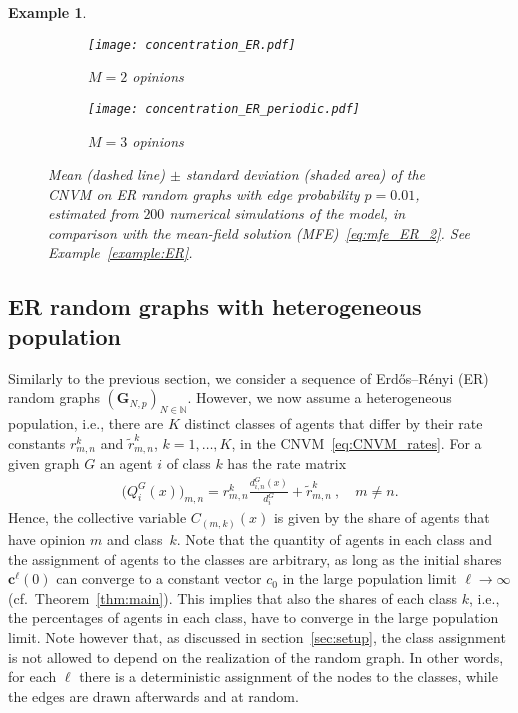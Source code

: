 \documentclass[a4paper,
               10pt,
               pdftex,
               normalheadings,
               headsepline,
               footsepline,
               headinclude,
               footinclude,
               DIV=14,
               abstracton]
{scrartcl}
\newtheorem{example}[theorem]{Example}
\newcommand{\rv}[1]{\bm{#1}}
\newcommand{\review}[1]{{#1}}
\begin{document}
\begin{example}
\begin{figure}
     \centering
     \begin{subfigure}[t]{0.49\textwidth}
         \centering
         \texttt{[image: concentration\_ER.pdf]}
         \caption{$M=2$ opinions}
         \label{fig:concentration_ER_a}
     \end{subfigure}
     \hfill
     \begin{subfigure}[t]{0.49\textwidth}
         \centering
         \texttt{[image: concentration\_ER\_periodic.pdf]}
         \caption{$M=3$ opinions}
         \label{fig:concentration_ER_b}
     \end{subfigure}
        \caption{Mean (dashed line) $\pm$ standard deviation (shaded area) of the CNVM on ER random graphs with edge probability $p=0.01$, estimated from $200$ \review{numerical simulations of the model}, in comparison with the mean-field solution (MFE)~\eqref{eq:mfe_ER_2}. See Example~\ref{example:ER}.}
        \label{fig:concentration_ER}
\end{figure}
\end{example}

\subsection{ER random graphs with heterogeneous population}
\label{subsec:hetero}

Similarly to the previous section, we consider a sequence of Erd\H{o}s--Rényi (ER) random graphs $(\rv{G}_{N,p})_{N\in\mathbb{N}}$.
However, we now assume a heterogeneous population, i.e., there are $K$ distinct classes of agents that differ by their rate constants $r^k_{m,n}$ and $\tilde{r}^k_{m,n}$, $k = 1,\dots,K$, in the CNVM~\eqref{eq:CNVM_rates}. 
For a given graph $G$ an agent $i$ of class $k$ has the rate matrix
\begin{align}
    \big(Q_i^G(x)\big)_{m,n} = r^k_{m, n} \frac{d_{i,n}^G(x)}{d_{i}^G} + \tilde{r}^k_{m,n}\ , \quad m\neq n.
\end{align}
Hence, the collective variable $C_{(m, k)}(x)$ is given by the share of agents that have opinion $m$ and class~$k$.
Note that the quantity of agents in each class and the assignment of agents to the classes are arbitrary, as long as the initial shares $\rv{c}^\ell(0)$ can converge to a constant vector $c_0$ in the large population limit $\ell \to \infty$ (cf.\ Theorem~\ref{thm:main}). This implies that also the shares of each class $k$, i.e., the percentages of agents in each class, have to converge in the large population limit.
Note however that, as discussed in section~\ref{sec:setup}, the class assignment is not allowed to depend on the realization of the random graph.
In other words, for each $\ell$ there is a deterministic assignment of the nodes to the classes, while the edges are drawn afterwards and at random.
\end{document}
